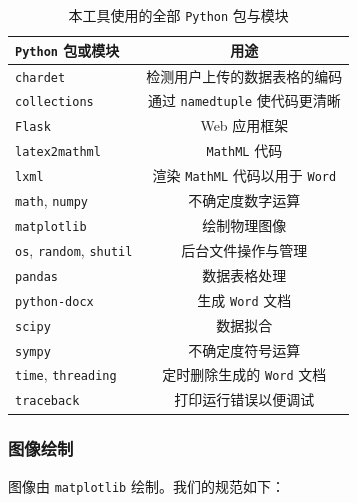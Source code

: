 \begin{table}[htbp]
  \caption{本工具使用的全部 \texttt{Python} 包与模块}
  \label{tab:pkg}
  \vskip 0.1in
  \centering\small
  \begin{tabular}{lc}
  \toprule
  \verb|Python| 包或模块 & 用途 \\
  \midrule
  \verb|chardet| & 检测用户上传的数据表格的编码 \\
  \verb|collections| & 通过 \verb|namedtuple| 使代码更清晰 \\
  \verb|Flask| & Web 应用框架 \\
  \verb|latex2mathml| &  \verb|MathML| 代码 \\
  \verb|lxml| & 渲染 \verb|MathML| 代码以用于 \verb|Word| \\
  \verb|math|, \verb|numpy| & 不确定度数字运算 \\
  \verb|matplotlib| & 绘制物理图像 \\
  \verb|os|, \verb|random|, \verb|shutil| & 后台文件操作与管理 \\
  \verb|pandas| & 数据表格处理 \\
  \verb|python-docx| & 生成 \verb|Word| 文档 \\
  \verb|scipy| & 数据拟合 \\
  \verb|sympy| & 不确定度符号运算 \\
  \verb|time|, \verb|threading| & 定时删除生成的 \verb|Word| 文档 \\
  \verb|traceback| & 打印运行错误以便调试 \\
  \bottomrule
  \end{tabular}
  \vskip -0.1in
\end{table}

\subsubsection{图像绘制}

图像由 \verb|matplotlib| 绘制。我们的规范如下：

